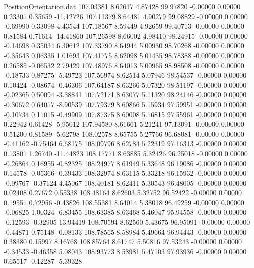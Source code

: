 \begin{filecontents}{PositionOrientation.dat}
 107.03381    8.62617    4.87428    99.97820   -0.00000    0.00000    0.23301    0.35659  -11.12726
 107.11379    8.64481    4.90279    99.08829   -0.00000    0.00000   -0.69990    0.33098    4.43544
 107.18567    8.59449    4.92659    99.40713   -0.00000    0.00000    0.81584    0.71614  -14.41860
 107.26598    8.66002    4.98410    98.24915   -0.00000    0.00000   -0.14698    0.35034    6.30612
 107.33790    8.64944    5.00930    98.70268   -0.00000    0.00000   -0.35643    0.06335    1.01693
 107.41775    8.62098    5.01435    98.78388   -0.00000    0.00000    0.26585   -0.06532    2.79429
 107.48976    8.64013    5.00965    98.98508   -0.00000    0.00000   -0.18733    0.87275   -5.49723
 107.56974    8.62514    5.07946    98.54537   -0.00000    0.00000    0.10424   -0.08674   -0.46306
 107.64187    8.63266    5.07320    98.51197   -0.00000    0.00000   -0.02365    0.50094   -3.38841
 107.72171    8.63077    5.11320    98.24146   -0.00000    0.00000   -0.30672    0.64017   -8.90539
 107.79379    8.60866    5.15934    97.59951   -0.00000    0.00000   -0.10734    0.11015   -0.49909
 107.87375    8.60008    5.16815    97.55961   -0.00000    0.00000    0.22942    0.61428   -5.95012
 107.94580    8.61661    5.21241    97.13091   -0.00000    0.00000    0.51200    0.81589   -5.62798
 108.02578    8.65755    5.27766    96.68081   -0.00000    0.00000   -0.41162   -0.75464    6.68175
 108.09796    8.62784    5.22319    97.16313   -0.00000    0.00000    0.13801    1.26740  -11.44823
 108.17771    8.63885    5.32426    96.25018   -0.00000    0.00000   -0.26864    0.16955   -0.82325
 108.24977    8.61949    5.33648    96.19086   -0.00000    0.00000    0.14578   -0.05366   -0.39433
 108.32974    8.63115    5.33218    96.15932   -0.00000    0.00000   -0.09767   -0.37124    4.45067
 108.40181    8.62411    5.30543    96.48005   -0.00000    0.00000    0.02408    0.27672    0.55338
 108.48164    8.62603    5.32752    96.52422   -0.00000    0.00000    0.19551    0.72956   -0.43826
 108.55381    8.64014    5.38018    96.49259   -0.00000    0.00000   -0.06825    1.00324   -6.83455
 108.63385    8.63468    5.46047    95.94558   -0.00000    0.00000   -0.12593   -0.32905   13.94419
 108.70594    8.62560    5.43675    96.95091   -0.00000    0.00000   -0.44871    0.75148   -0.08133
 108.78565    8.58984    5.49664    96.94443   -0.00000    0.00000    0.38380    0.15997    8.16768
 108.85764    8.61747    5.50816    97.53243   -0.00000    0.00000   -0.34533   -0.46358    5.08043
 108.93773    8.58981    5.47103    97.93936   -0.00000    0.00000    0.65517   -0.12287   -5.39328

\end{filecontents}
